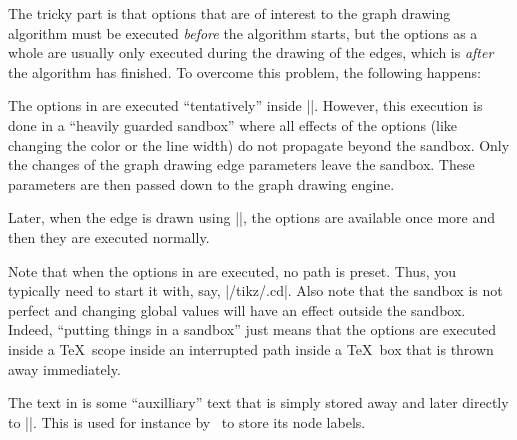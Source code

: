 \begin{command}{\pgfgdedge{}}
  The tricky part is that options that are of interest to the graph
  drawing algorithm must be executed \emph{before} the algorithm starts,
  but the options as a whole are usually only executed during the
  drawing of the edges, which is \emph{after} the algorithm has finished.
  To overcome this problem, the following happens:

  The options in  are executed ``tentatively'' inside
  |\pgfgdedge|. However, this execution is done in a ``heavily guarded
  sandbox'' where all effects of the options (like changing the
  color or the line width) do not propagate beyond the sandbox. Only
  the changes of the graph drawing edge parameters leave the
  sandbox. These parameters are then passed down to the graph drawing
  engine.

  Later, when the edge is drawn using |\pgfgdedgecallback|, the
  options  are available once more and then they
  are executed normally.

  Note that when the options in  are executed, no
  path is preset. Thus, you typically need to start it with, say,
  |/tikz/.cd|. Also note that the sandbox is not perfect and changing
  global values will have an effect outside the sandbox. Indeed,
  ``putting things in a sandbox'' just means that the options are
  executed inside a \TeX\ scope inside an interrupted path inside a
  \TeX\ box that is thrown away immediately. 
  
  The text in  is some ``auxilliary'' text that is
  simply stored away and later directly to |\pgfgdedgecallback|. This
  is used for instance by \tikzname\ to store its node labels. 
\end{command}


